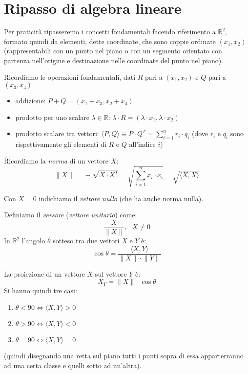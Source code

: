 \chapter{Ripasso di algebra lineare}
Per praticità ripasseremo i concetti fondamentali facendo riferimento a $\mathbb{R}^2$,
formato quindi da elementi, dette coordinate, che sono coppie ordinate $(x_1,x_2)$
(rappresentabili con un punto nel piano o con un segmento orientato con partenza
nell'origine e destinazione nelle coordinate del punto nel piano).

Ricordiamo le operazioni fondamentali, dati $R$ pari a $(x_1,x_2)$ e $Q$ pari a $(x_3,x_4)$
\begin{itemize}
    \item addizione: $P+Q=(x_1+x_3, x_2+x_4)$
    \item prodotto per uno scalare $\lambda\in\mathbb{R}$: $\lambda\cdot R=(\lambda\cdot x_1,\lambda\cdot x_2)$
    \item prodotto scalare tra vettori: $\langle P,Q\rangle\equiv P\cdot Q^T = \sum_{i=1}^n r_i\cdot q_i$
          (dove $r_i$ e $q_i$ sono rispettivamente gli elementi di $R$ e $Q$ all'indice $i$)
\end{itemize}

Ricordiamo la \textit{norma} di un vettore $X$:
\begin{equation}
    \lVert X \rVert=\equiv\sqrt{X\cdot X^T}=\sqrt{\sum_{i=1}^n x_i\cdot x_i}=\sqrt{\langle X,X\rangle}
\end{equation}

Con $X=0$ indichiamo il \textit{vettore nullo} (che ha anche norma nulla).

Definiamo il \textit{versore} (\textit{vettore unitario}) come:
\begin{equation}
    \frac{X}{\lVert X \rVert},\ \ \ X \neq 0
\end{equation}
In $\mathbb{R}^2$ l'angolo $\theta$ sotteso tra due vettori $X$ e $Y$ è:
\begin{equation}
    \cos\theta=\frac{\langle X,Y\rangle}{\lVert X \rVert\cdot \lVert Y \rVert}
\end{equation}

La proiezione di un vettore $X$ sul vettore $Y$ è:
\begin{equation}
    X_Y = \lVert X \rVert \cdot \cos\theta
\end{equation}
Si hanno quindi tre casi:
\begin{enumerate}
    \item $\theta < 90 \iff \langle X,Y\rangle >0$
    \item $\theta > 90 \iff \langle X,Y\rangle <0$
    \item $\theta = 90 \iff \langle X,Y\rangle =0$
\end{enumerate}
(quindi disegnando una retta sul piano tutti i punti sopra di essa apparterranno
ad una certa classe e quelli sotto ad un'altra).

